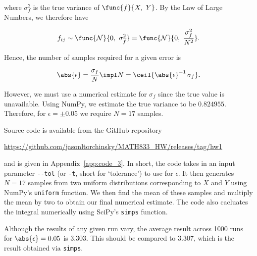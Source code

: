 where $\sigma_f^2$ is the true variance of $\func{f}{X,\ Y}$. By the Law of Large Numbers, we therefore have

\begin{equation}
	f_{ij} \sim \func{\mathcal{N}}{0,\ \sigma_{\overline{f}}^2} = \func{\mathcal{N}}{0,\ \frac{\sigma_{f}^2}{N^2}}.
\end{equation}

Hence, the number of samples required for a given error is

\begin{equation}
	\abs{\epsilon} = \frac{\sigma_f}{N} \impl N = \ceil{\abs{\epsilon}^{-1}\,\sigma_f}.
\end{equation}

However, we must use a numerical estimate for $\sigma_f$ since the true value is unavailable. Using NumPy, we estimate the true variance to be $0.824955$. Therefore, for $\epsilon = \pm 0.05$ we require $N = 17$ samples.

Source code is available from the GitHub repository
	
\begin{center}
	\url{https://github.com/jasonltorchinsky/MATH833_HW/releases/tag/hw1}
\end{center}

and is given in Appendix~\ref{app:code_3}. In short, the code takes in an input parameter \texttt{-{}-tol} (or \texttt{-t}, short for `tolerance') to use for $\epsilon$. It then generates $N = 17$ samples from two uniform distributions corresponding to $X$ and $Y$ using NumPy's \texttt{uniform} function. We then find the mean of these samples and multiply the mean by two to obtain our final numerical estimate. The code also cacluates the integral numerically using SciPy's \texttt{simps} function.

Although the results of any given run vary, the average result across 1000 runs for $\abs{\epsilon} = 0.05$ is $3.303$. This should be compared to $3.307$, which is the result obtained via \texttt{simps}.